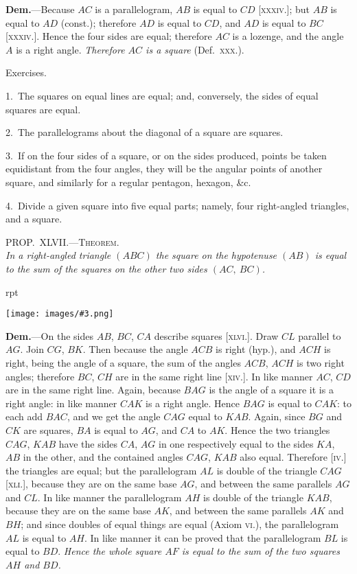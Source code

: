 \documentclass[oneside]{book}
\newcounter{wrapwidth}
\newcommand\myprop[2]{
\bigskip\Needspace*{4\baselineskip}\begin{center}\textsc{#1}\\\medskip\emph{#2}\par\end{center}
}
\newcommand\exhead[1]{
\Needspace*{5\baselineskip}\begin{center}
\textsf{#1}
\end{center}
}
\newcommand\imgflow[3]{
\setcounter{wrapwidth}{#1}
\begin{wrapfigure}[#2]{r}{\value{wrapwidth}pt}
\begin{center}
\vspace{-0.3in}
\texttt{[image: images/\#3.png]}
\end{center}
\end{wrapfigure}
}
\begin{document}
\textbf{Dem.}---Because $AC$ is a parallelogram,
$AB$ is equal to $CD$ [\textsc{xxxiv}.];
but $AB$ is equal to $AD$ (const.); therefore
$AD$ is equal to $CD$, and $AD$ is
equal to $BC$ [\textsc{xxxiv}.]. Hence the four sides are equal;
therefore $AC$ is a lozenge, and the angle $A$ is a right
angle. \emph{Therefore $AC$ is a square} (Def.~\textsc{xxx}.).



\exhead{Exercises.}

\begin{footnotesize}
1.~The squares on equal lines are equal; and, conversely, the
sides of equal squares are equal.

2.~The parallelograms about the diagonal of a square are
squares.

3.~If on the four sides of a square, or on the sides produced,
points be taken equidistant from the four angles, they will be the
angular points of another square, and similarly for a regular
pentagon, hexagon, \&c.

4.~Divide a given square into five equal parts; namely, four
right-angled triangles, and a square.
\par\end{footnotesize}


\myprop{PROP\@.~XLVII\@.---Theorem.}{In a right-angled triangle $(ABC)$ the square on the
hypotenuse $(AB)$ is equal to the sum of the squares on the other two sides $(AC,\ BC)$.}

\imgflow{175}{15}{f068}

\textbf{Dem.}---On the sides $AB$, $BC$, $CA$ describe squares
[\textsc{xlvi}.]. Draw $CL$ parallel
to $AG$. Join $CG$,
$BK$. Then because the
angle $ACB$ is right
(hyp.), and $ACH$ is
right, being the angle
of a square, the sum of
the angles $ACB$, $ACH$
is two right angles;
therefore $BC$, $CH$ are
in the same right line
[\textsc{xiv}.]. In like manner
$AC$, $CD$ are in the
same right line. Again,
because $BAG$ is the
angle of a square it is a right angle: in like manner
$CAK$ is a right angle. Hence $BAG$ is equal to $CAK$:
to each add $BAC$, and we get the angle $CAG$ equal to
$KAB$. Again, since $BG$ and $CK$ are squares, $BA$ is
equal to $AG$, and $CA$ to $AK$. Hence the two triangles
$CAG$, $KAB$ have the sides $CA$, $AG$ in one respectively
equal to the sides $KA$, $AB$ in the other, and the contained
angles $CAG$, $KAB$ also equal. Therefore [\textsc{iv}.]
the triangles are equal; but the parallelogram $AL$ is
double of the triangle $CAG$ [\textsc{xli}.], because they are on
the same base $AG$, and between the same parallels $AG$
and $CL$. In like manner the parallelogram
$AH$ is double
of the triangle $KAB$, because they are on the same base
$AK$, and between the same parallels $AK$ and $BH$; and
since doubles of equal things are equal (Axiom \textsc{vi}.),
the parallelogram $AL$ is equal to $AH$. In like manner
it can be proved that the parallelogram $BL$ is equal to
$BD$. \emph{Hence the whole square $AF$ is equal to the sum of
the two squares $AH$ and $BD$.}\par\newpage %
\end{document}
